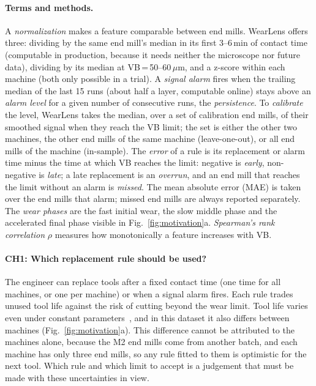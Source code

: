 \paragraph{Terms and methods.}
A \emph{normalization} makes a feature comparable between end mills. WearLens offers three:
dividing by the same end mill's median in its first 3--6\,min of contact time (computable in production,
because it needs neither the microscope nor future data), dividing by its median at VB\,=\,50--60\,$\mu$m,
and a z-score within each machine (both only possible in a trial). A \emph{signal alarm} fires when the
trailing median of the last 15 runs (about half a layer, computable online) stays above an \emph{alarm level}
for a given number of consecutive runs, the \emph{persistence}. To \emph{calibrate} the level, WearLens takes
the median, over a set of calibration end mills, of their smoothed signal when they reach the VB limit; the set
is either the other two machines, the other end mills of the same machine (leave-one-out), or all end mills of
the machine (in-sample). The \emph{error} of a rule is its replacement or alarm time minus the time at which VB
reaches the limit: negative is \emph{early}, non-negative is \emph{late}; a late replacement is an \emph{overrun},
and an end mill that reaches the limit without an alarm is \emph{missed}. The mean absolute error (MAE) is taken
over the end mills that alarm; missed end mills are always reported separately. The \emph{wear phases} are the fast initial wear, the slow
middle phase and the accelerated final phase visible in Fig.~\ref{fig:motivation}a.
\emph{Spearman's rank correlation} $\rho$ measures how monotonically a feature increases with VB.

\paragraph{CH1: Which replacement rule should be used?}
The engineer can replace tools after a fixed contact time (one time for all machines, or one per machine)
or when a signal alarm fires. Each rule trades unused tool life against the risk of cutting beyond the wear
limit. Tool life varies even under constant parameters~\cite{denkena2023}, and in this dataset it also
differs between machines (Fig.~\ref{fig:motivation}a). This difference cannot be attributed to the
machines alone, because the M2 end mills come from another batch, and each machine has only three end
mills, so any rule fitted to them is optimistic for the next tool. Which rule and which limit to accept is a
judgement that must be made with these uncertainties in view.

